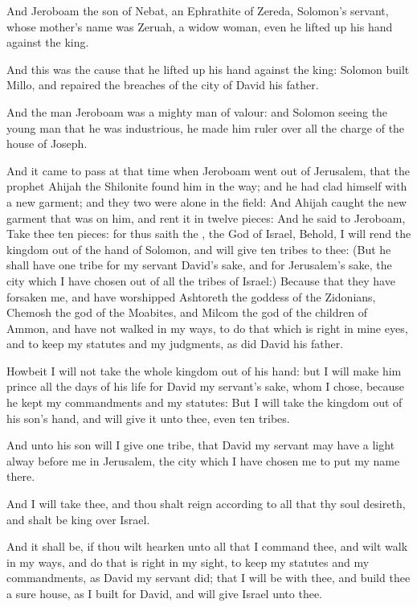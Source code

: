 \Verse And Jeroboam the son of Nebat, an Ephrathite of Zereda, Solomon's servant, whose mother's name was Zeruah, a widow woman, even he lifted up his hand against the king.

\Verse And this was the cause that he lifted up his hand against the king: Solomon built Millo, and repaired the breaches of the city of David his father.

\Verse And the man Jeroboam was a mighty man of valour: and Solomon seeing the young man that he was industrious, he made him ruler over all the charge of the house of Joseph.

\Verse And it came to pass at that time when Jeroboam went out of Jerusalem, that the prophet Ahijah the Shilonite found him in the way; and he had clad himself with a new garment; and they two were alone in the field: \Verse And Ahijah caught the new garment that was on him, and rent it in twelve pieces: \Verse And he said to Jeroboam, Take thee ten pieces: for thus saith the \LORD, the God of Israel, Behold, I will rend the kingdom out of the hand of Solomon, and will give ten tribes to thee: \Verse (But he shall have one tribe for my servant David's sake, and for Jerusalem's sake, the city which I have chosen out of all the tribes of Israel:) \Verse Because that they have forsaken me, and have worshipped Ashtoreth the goddess of the Zidonians, Chemosh the god of the Moabites, and Milcom the god of the children of Ammon, and have not walked in my ways, to do that which is right in mine eyes, and to keep my statutes and my judgments, as did David his father.

\Verse Howbeit I will not take the whole kingdom out of his hand: but I will make him prince all the days of his life for David my servant's sake, whom I chose, because he kept my commandments and my statutes: \Verse But I will take the kingdom out of his son's hand, and will give it unto thee, even ten tribes.

\Verse And unto his son will I give one tribe, that David my servant may have a light alway before me in Jerusalem, the city which I have chosen me to put my name there.

\Verse And I will take thee, and thou shalt reign according to all that thy soul desireth, and shalt be king over Israel.

\Verse And it shall be, if thou wilt hearken unto all that I command thee, and wilt walk in my ways, and do that is right in my sight, to keep my statutes and my commandments, as David my servant did; that I will be with thee, and build thee a sure house, as I built for David, and will give Israel unto thee.

